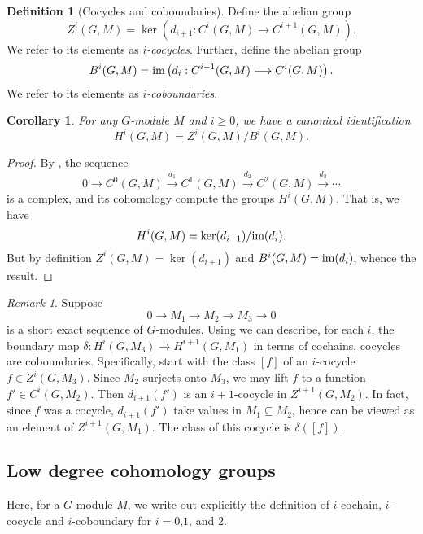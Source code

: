 \documentclass[11pt]{amsart}
\numberwithin{equation}{section}
\newtheorem{cor}[equation]{Corollary}
\theoremstyle{remark}
\newtheorem{remark}[equation]{Remark}
\theoremstyle{remark}
\theoremstyle{remark}
\theoremstyle{definition}
\theoremstyle{definition}
\theoremstyle{definition}
\newtheorem{defi}[equation]{Definition}
\theoremstyle{definition}
\theoremstyle{definition}
\theoremstyle{definition}
\begin{document}
\begin{defi}[Cocycles and coboundaries]
Define the abelian group
\[Z^i(G,M)=\ker\left(d_{i+1}:C^i(G,M)\longrightarrow C^{i+1}(G,M)\right).\]
We refer to its elements as $i$\textit{-cocycles}. Further, define the abelian group
\[B^i(G,M)=\textup{im}\left(d_i:C^{i-1}(G,M)\longrightarrow C^i(G,M)\right).\]
We refer to its elements as $i$\textit{-coboundaries}.
\end{defi}

\begin{cor}
For any $G$-module $M$ and $i\geq 0$, we have a canonical identification
\[H^i(G,M)=Z^i(G,M)/B^i(G,M).\]
\end{cor}

\begin{proof}
By , the sequence
\[0\longrightarrow C^0(G,M)\stackrel{d_1}{\longrightarrow} C^1(G,M)\stackrel{d_2}{\longrightarrow}C^2(G,M)\stackrel{d_3}{\longrightarrow} \cdots\]
is a complex, and its cohomology compute the groups $H^i(G,M)$. 
That is, we have
\[H^i(G,M)=\ker(d_{i+1})/\textup{im}(d_i).\]
But by definition $Z^i(G,M)=\ker(d_{i+1})$ and $B^i(G,M)=\textup{im}(d_i)$, whence the result.
\end{proof}

\begin{remark} \label{explicit boundary 2}
Suppose \[0\rightarrow M_1 \rightarrow M_2 \rightarrow M_3 \rightarrow 0\]
is a short exact sequence of $G$-modules. Using  we can describe, for each $i$, the boundary map $\delta:H^i(G,M_3)\rightarrow H^{i+1}(G,M_1)$ in terms of cochains, cocycles are coboundaries. Specifically, start with the class $[f]$ of an $i$-cocycle $f\in Z^i(G,M_3)$. Since $M_2$ surjects onto $M_3$, we may lift $f$ to a function $f'\in C^i(G,M_2)$. Then $d_{i+1}(f')$ is an $i+1$-cocycle in $Z^{i+1}(G,M_2)$. In fact, since $f$ was a cocycle, $d_{i+1}(f')$  take values in $M_1\subseteq M_2$, hence can be viewed as an element of $Z^{i+1}(G,M_1)$. The class of this cocycle is $\delta([f])$.
\end{remark}

\subsection{Low degree cohomology groups} \label{low degree cocycles}

Here, for a $G$-module $M$, we write out explicitly the definition of $i$-cochain, $i$-cocycle and $i$-coboundary for $i=0$,$1$, and $2$. 
\end{document}
